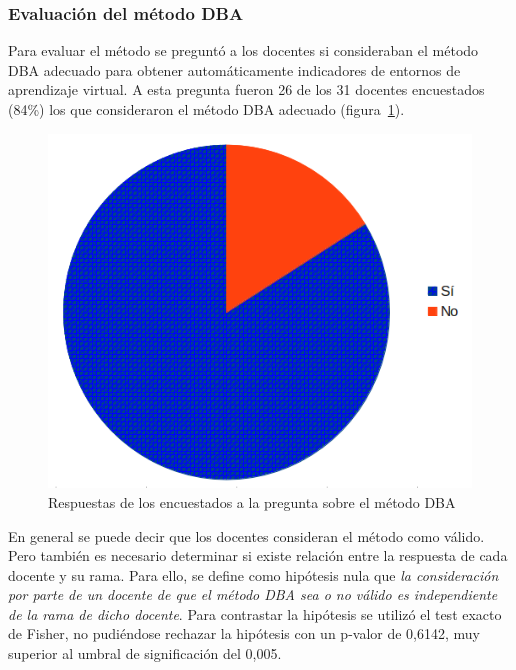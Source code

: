 \subsubsection{Evaluación del método DBA}

Para evaluar el método se preguntó a los docentes si consideraban el método DBA adecuado para obtener automáticamente indicadores de entornos de aprendizaje virtual. A esta pregunta fueron 26 de los 31 docentes encuestados (84\%) los que consideraron el método DBA adecuado (figura~\ref{fig:cap:encuesta:metodoDBA}).


\begin{figure}
  \begin{center}
    \includegraphics[scale=0.4]{EncuestaMetodoDBA.png}
  \end{center}
  \caption{Respuestas de los encuestados a la pregunta sobre el método DBA}
  \label{fig:cap:encuesta:metodoDBA}
\end{figure}

En general se puede decir que los docentes consideran el método como válido. Pero también es necesario determinar si existe relación entre la respuesta de cada docente y su rama. Para ello, se define como hipótesis nula que \emph{la consideración por parte de un docente de que el método DBA sea o no válido es independiente de la rama de dicho docente}. Para contrastar la hipótesis se utilizó el test exacto de Fisher, no pudiéndose rechazar la hipótesis con un p-valor de 0,6142, muy superior al umbral de significación del 0,005.

